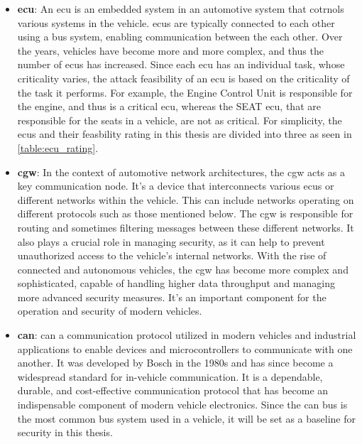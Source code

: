 \begin{itemize}
    \item \textbf{\acrshort{ecu}}: An \acrshort{ecu} is an embedded system in an automotive system that cotrnols various systems in the vehicle.
    \acrshort{ecu}s are typically connected to each other using a bus system, enabling communication between the each other.
    Over the years, vehicles have become more and more complex, and thus the number of \acrshort{ecu}s has increased.
    Since each \acrshort{ecu} has an individual task, whose criticality varies, the attack feasibility of an \acrshort{ecu} is based on the criticality of the task it performs.
    For example, the Engine Control Unit is responsible for the engine, and thus is a critical \acrshort{ecu}, 
    whereas the SEAT \acrshort{ecu}, that are responsible for the seats in a vehicle, are not as critical.
    For simplicity, the \acrshort{ecu}s and their feasbility rating in this thesis are divided into three as seen in \ref{table:ecu_rating}.

    \item \textbf{\acrshort{cgw}}: In the context of automotive network architectures, the \acrshort{cgw} acts as a key communication node. 
    It's a device that interconnects various \acrshort{ecu}s or different networks within the vehicle. 
    This can include networks operating on different protocols such as those mentioned below.
    The \acrshort{cgw} is responsible for routing and sometimes filtering messages between these different networks. 
    It also plays a crucial role in managing security, as it can help to prevent unauthorized access to the vehicle's internal networks.
    With the rise of connected and autonomous vehicles, the \acrshort{cgw} has become more complex and sophisticated, 
    capable of handling higher data throughput and managing more advanced security measures. 
    It's an important component for the operation and security of modern vehicles.
    
    \item \textbf{\acrshort{can}}: \acrshort{can} a communication protocol utilized in modern vehicles and industrial applications 
    to enable devices and microcontrollers to communicate with one another. 
    It was developed by Bosch in the 1980s and has since become a widespread standard for in-vehicle communication.
    It is a dependable, durable, and cost-effective communication protocol that has become an indispensable component of modern vehicle electronics.
    Since the \acrshort{can} bus is the most common bus system used in a vehicle, it will be set as a baseline for security in this thesis.


\end{itemize}
